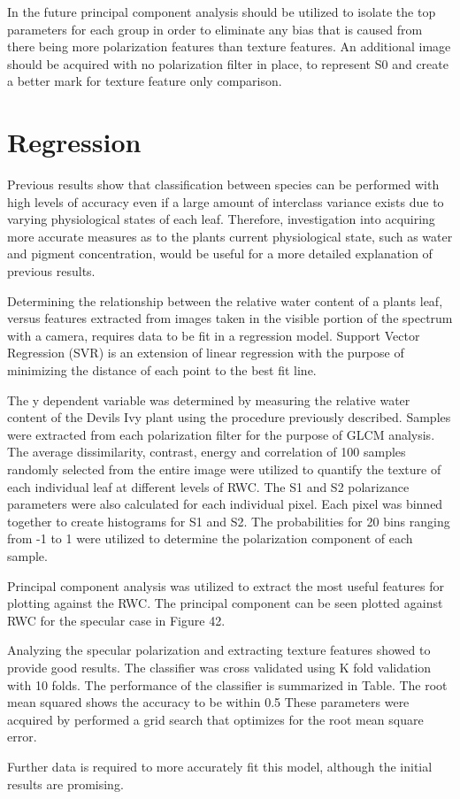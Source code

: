In the future principal component analysis should be utilized to isolate the top parameters for each group in order to eliminate any bias that is caused from there being more polarization features than texture features. An additional image should be acquired with no polarization filter in place, to represent S0 and create a better mark for texture feature only comparison.

\section{Regression}
Previous results show that classification between species can be performed with high levels of accuracy even if a large amount of interclass variance exists due to varying physiological states of each leaf.  Therefore, investigation into acquiring more accurate measures as to the plants current physiological state, such as water and pigment concentration, would be useful for a more detailed explanation of previous results.

Determining the relationship between the relative water content of a plants leaf, versus features extracted from images taken in the visible portion of the spectrum with a camera, requires data to be fit in a regression model.  Support Vector Regression (SVR) is an extension of linear regression with the purpose of minimizing the distance of each point to the best fit line.

The y dependent variable was determined by measuring the relative water content of the Devils Ivy plant using the procedure previously described.  Samples were extracted from each polarization filter for the purpose of GLCM analysis.  The average dissimilarity, contrast, energy and correlation of 100 samples randomly selected from the entire image were utilized to quantify the texture of each individual leaf at different levels of RWC.  The S1 and S2 polarizance parameters were also calculated for each individual pixel. Each pixel was binned together to create histograms for S1 and S2.  The probabilities for 20 bins ranging from -1 to 1 were utilized to determine the polarization component of each sample.

Principal component analysis was utilized to extract the most useful features for plotting against the RWC.  The principal component can be seen plotted against RWC for the specular case in Figure 42.
%
\begin{center}
\end{center}
%
Analyzing the specular polarization and extracting texture features showed to provide good results.  The classifier was cross validated using K fold validation with 10 folds.  The performance of the classifier is summarized in Table.
The root mean squared shows the accuracy to be within 0.5%
These parameters were acquired by performed a grid search that optimizes for the root mean square error.

Further data is required to more accurately fit this model, although the initial results are promising.
